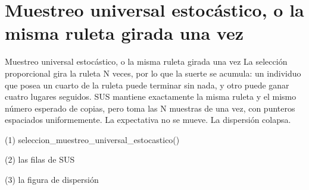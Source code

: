 
\section{Muestreo universal estocástico, o la misma ruleta girada una vez}

\begin{frame}{Muestreo universal estocástico, o la misma ruleta girada una vez}
La selección proporcional gira la ruleta N veces, por lo que la suerte se acumula: un
individuo que posea un cuarto de la ruleta puede terminar sin nada, y
otro puede ganar cuatro lugares seguidos. SUS mantiene exactamente la misma ruleta y el
mismo número esperado de copias, pero toma las N muestras de una vez, con punteros
espaciados uniformemente. La expectativa no se mueve. La dispersión colapsa.
\end{frame}

\begin{frame}[fragile]{(1) seleccion\_muestreo\_universal\_estocastico()}

\end{frame}

\begin{frame}[fragile]{(2) las filas de SUS}

\end{frame}

\begin{frame}[fragile]{(3) la figura de dispersión}

\end{frame}


